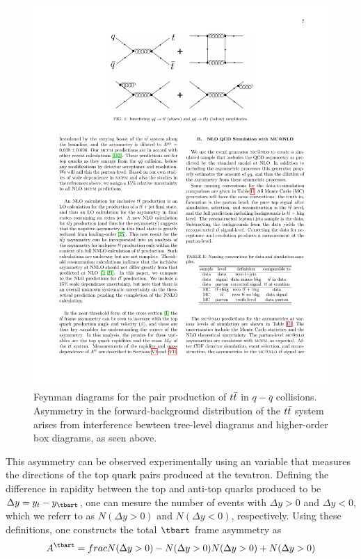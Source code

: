 \begin{figure}
  \begin{center}
    \includegraphics[width=125mm]{figures/theory/ttbarForwardBackwardFeynman}
  \end{center}
  \caption{Feynman diagrams for the pair production of $t\bar{t}$ in $q-\overbar{q}$ collisions.  Asymmetry in the forward-background distribution of the $t\bar{t}$ system arises from interference bewteen tree-level diagrams and higher-order box diagrams, as seen above.}
  \label{img:ForwardBackwardFeynman}
\end{figure}

This asymmetry can be observed experimentally using an variable that measures the directions of the top quark pairs produced at the tevatron.
Defining the difference in rapidity between the top and anti-top quarks produced to be $\Delta y = y_{t} - y_{\tbart}$, one can mesure the number of events with $\Delta y>0$ and $\Delta y<0$, which we referr to as $N(\Delta y>0)$ and $N(\Delta y < 0)$, respectively.
Using these definitions, one constructs the total $\tbart$ frame asymmetry as
\begin{equation}
  A^{\tbart} = frac{N(\Delta y>0) - N(\Delta y>0)}{N(\Delta y>0) + N(\Delta y>0)}
\end{equation}

